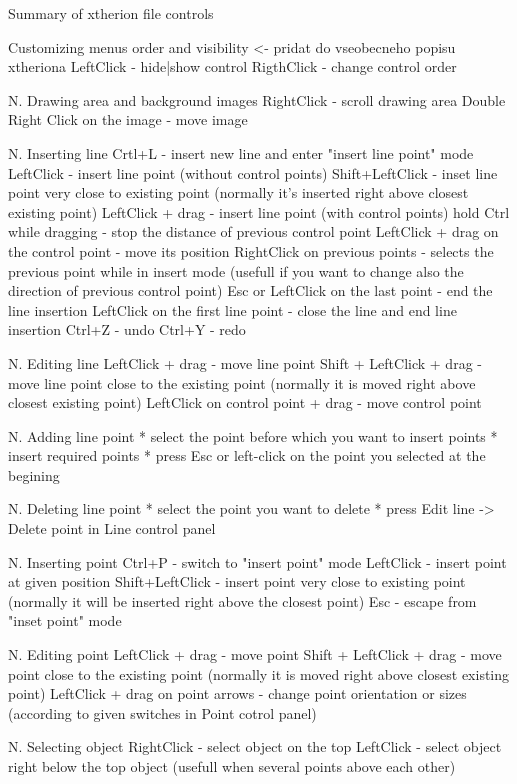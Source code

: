 Summary of xtherion file controls

Customizing menus order and visibility <- pridat do vseobecneho 
popisu xtheriona
  LeftClick - hide|show control
  RigthClick - change control order

N. Drawing area and background images
  RightClick - scroll drawing area
  Double Right Click on the image - move image

N. Inserting line
  Crtl+L - insert new line and enter "insert line point" mode
  LeftClick - insert line point (without control points)
  Shift+LeftClick - inset line point very close to existing point 
    (normally it's inserted right above closest existing point)
  LeftClick + drag - insert line point (with control points)
  hold Ctrl while dragging - stop the distance of previous control point
  LeftClick + drag on the control point - move its position
  RightClick on previous points - selects the previous point while in
    insert mode (usefull if you want to change also the direction of
    previous control point)
  Esc or LeftClick on the last point - end the line insertion
  LeftClick on the first line point - close the line and end line insertion
  Ctrl+Z - undo
  Ctrl+Y - redo

N. Editing line
  LeftClick + drag - move line point
  Shift + LeftClick + drag - move line point close to the existing
    point (normally it is moved right above closest existing point)
  LeftClick on control point + drag - move control point

N. Adding line point
  * select the point before which you want to insert points
  * insert required points
  * press Esc or left-click on the point you selected at the begining
  
N. Deleting line point
  * select the point you want to delete
  * press Edit line -> Delete point in Line control panel

N. Inserting point
  Ctrl+P - switch to "insert point" mode
  LeftClick - insert point at given position
  Shift+LeftClick - insert point very close to existing point (normally it
    will be inserted right above the closest point)
  Esc - escape from "inset point" mode

N. Editing point
  LeftClick + drag - move point
  Shift + LeftClick + drag - move point close to the existing
    point (normally it is moved right above closest existing point)
  LeftClick + drag on point arrows - change point orientation or
    sizes (according to given switches in Point cotrol panel)

N. Selecting object
  RightClick - select object on the top
  LeftClick - select object right below the top object (usefull when several
    points above each other)
    